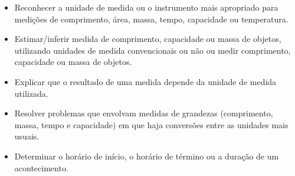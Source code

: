 \begin{escolha}

\begin{itemize}
    \item Reconhecer a unidade de medida ou o instrumento mais apropriado para
medições de comprimento, área, massa, tempo, capacidade ou temperatura.

    \item Estimar/inferir medida de comprimento, capacidade ou massa de objetos,
utilizando unidades de medida convencionais ou não ou medir comprimento,
capacidade ou massa de objetos.

    \item Explicar que o resultado de uma medida depende da unidade de medida
utilizada.

    \item Resolver problemas que envolvam medidas de grandezas (comprimento,
massa, tempo e capacidade) em que haja conversões entre as unidades mais
usuais.

    \item Determinar o horário de início, o horário de término ou a duração de
um acontecimento.
\end{itemize}




\end{escolha}
